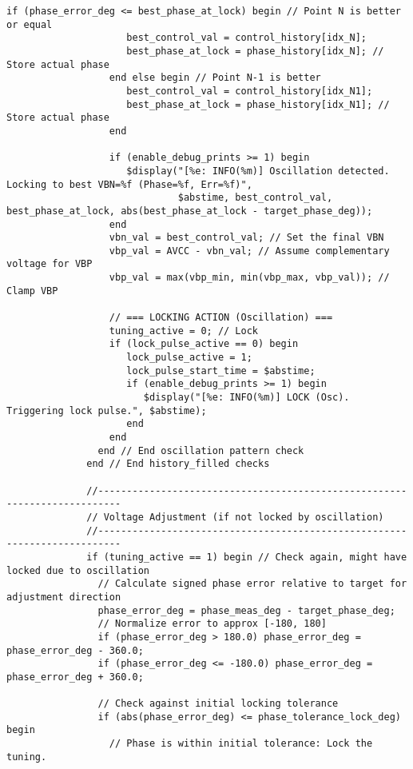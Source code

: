 \begin{lstlisting}[caption={Verilog-A Generic Vb Tuner Implementation}]
                  if (phase_error_deg <= best_phase_at_lock) begin // Point N is better or equal
                     best_control_val = control_history[idx_N];
                     best_phase_at_lock = phase_history[idx_N]; // Store actual phase
                  end else begin // Point N-1 is better
                     best_control_val = control_history[idx_N1];
                     best_phase_at_lock = phase_history[idx_N1]; // Store actual phase
                  end

                  if (enable_debug_prints >= 1) begin
                     $display("[%e: INFO(%m)] Oscillation detected. Locking to best VBN=%f (Phase=%f, Err=%f)",
                              $abstime, best_control_val, best_phase_at_lock, abs(best_phase_at_lock - target_phase_deg));
                  end
                  vbn_val = best_control_val; // Set the final VBN
                  vbp_val = AVCC - vbn_val; // Assume complementary voltage for VBP
                  vbp_val = max(vbp_min, min(vbp_max, vbp_val)); // Clamp VBP

                  // === LOCKING ACTION (Oscillation) ===
                  tuning_active = 0; // Lock
                  if (lock_pulse_active == 0) begin
                     lock_pulse_active = 1;
                     lock_pulse_start_time = $abstime;
                     if (enable_debug_prints >= 1) begin
                        $display("[%e: INFO(%m)] LOCK (Osc). Triggering lock pulse.", $abstime);
                     end
                  end
                end // End oscillation pattern check
              end // End history_filled checks

              //--------------------------------------------------------------------------
              // Voltage Adjustment (if not locked by oscillation)
              //--------------------------------------------------------------------------
              if (tuning_active == 1) begin // Check again, might have locked due to oscillation
                // Calculate signed phase error relative to target for adjustment direction
                phase_error_deg = phase_meas_deg - target_phase_deg;
                // Normalize error to approx [-180, 180]
                if (phase_error_deg > 180.0) phase_error_deg = phase_error_deg - 360.0;
                if (phase_error_deg <= -180.0) phase_error_deg = phase_error_deg + 360.0;

                // Check against initial locking tolerance
                if (abs(phase_error_deg) <= phase_tolerance_lock_deg) begin
                  // Phase is within initial tolerance: Lock the tuning.


\end{lstlisting}
